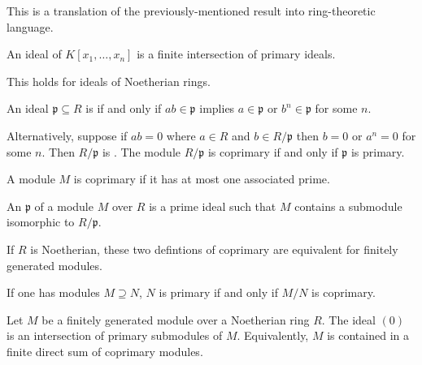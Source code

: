 \documentclass[11pt, oneside,margin=1in]{article}
\begin{document}
This is a translation of the previously-mentioned result into ring-theoretic language.
\begin{theorem}[Lasker]\label{}\index{}\text{}
An ideal of $K[x_1,\hdots, x_n]$ is a finite intersection of primary ideals.
\end{theorem}
\begin{theorem}[Noether]\label{}\index{}\text{}
This holds for ideals of Noetherian rings.
\end{theorem}

\begin{definition}\label{}\text{}
An ideal $\mathfrak{p}\subseteq R$ is  if and only if $ab\in \mathfrak{p}$ implies $a\in \mathfrak{p}$ or $b^n\in \mathfrak{p}$ for some $n$.
\end{definition}

Alternatively, suppose if $ab=0$ where $a\in R$ and $b\in R/\mathfrak{p}$ then $b=0$ or $a^n=0$ for some $n$. Then $R/\mathfrak{p}$ is . The module $R/\mathfrak{p}$ is coprimary if and only if $\mathfrak{p}$ is primary.

\begin{definition}[ ]\label{}\text{}
A module $M$ is coprimary if it has at most one associated prime.
\end{definition}

\begin{definition}[ ]\label{}\text{}
An  $\mathfrak{p}$ of a module $M$ over $R$ is a prime ideal such that $M$ contains a submodule isomorphic to $R/\mathfrak{p}$.
\end{definition}
\begin{remark}
If $R$ is Noetherian, these two defintions of coprimary are equivalent for finitely generated modules.
\end{remark}

If one has modules $M\supseteq N$, $N$ is primary if and only if $M/N$ is coprimary.

\begin{theorem}\label{}\index{}\text{}
Let $M$ be a finitely generated module over a Noetherian ring $R$. The ideal $(0)$ is an intersection of primary submodules of $M$. Equivalently, $M$ is contained in a finite direct sum of coprimary modules.
\end{theorem}
\end{document}
